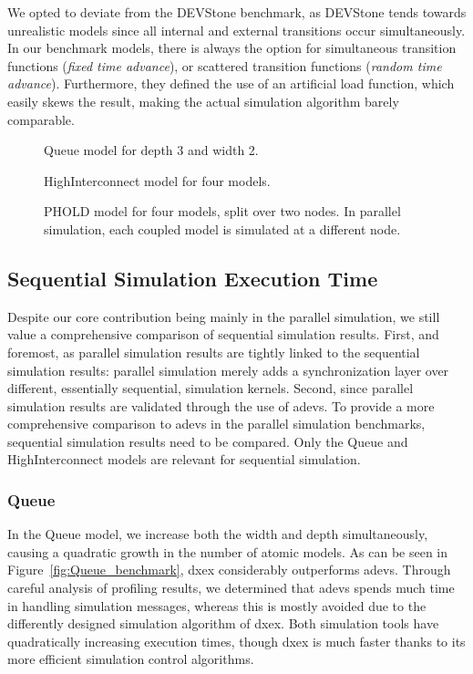 We opted to deviate from the DEVStone benchmark, as DEVStone tends towards unrealistic models since all internal and external transitions occur simultaneously.
In our benchmark models, there is always the option for simultaneous transition functions (\textit{fixed time advance}), or scattered transition functions (\textit{random time advance}).
Furthermore, they defined the use of an artificial load function, which easily skews the result, making the actual simulation algorithm barely comparable.

\begin{figure}
    \center
    \caption{Queue model for depth 3 and width 2.}
    \label{fig:queue_model}

    \caption{HighInterconnect model for four models.}
    \label{fig:interconnect_model}

    \caption{PHOLD model for four models, split over two nodes. In parallel simulation, each coupled model is simulated at a different node.}
    \label{fig:PHOLD_model}
\end{figure}

\subsection{Sequential Simulation Execution Time}
Despite our core contribution being mainly in the parallel simulation, we still value a comprehensive comparison of sequential simulation results.
First, and foremost, as parallel simulation results are tightly linked to the sequential simulation results: parallel simulation merely adds a synchronization layer over different, essentially sequential, simulation kernels.
Second, since parallel simulation results are validated through the use of adevs.
To provide a more comprehensive comparison to adevs in the parallel simulation benchmarks, sequential simulation results need to be compared.
Only the Queue and HighInterconnect models are relevant for sequential simulation.

\subsubsection{Queue}
In the Queue model, we increase both the width and depth simultaneously, causing a quadratic growth in the number of atomic models.
As can be seen in Figure~\ref{fig:Queue_benchmark}, dxex considerably outperforms adevs.
Through careful analysis of profiling results, we determined that adevs spends much time in handling simulation messages, whereas this is mostly avoided due to the differently designed simulation algorithm of dxex.
Both simulation tools have quadratically increasing execution times, though dxex is much faster thanks to its more efficient simulation control algorithms.

